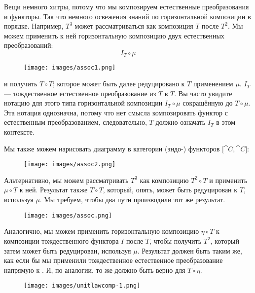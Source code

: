 Вещи немного хитры, потому что мы композируем естественные
преобразования и функторы. Так что немного освежения знаний по горизонтальной
композиции в порядке. Например, $T^3$ может рассматриваться как
композиция $T$ после $T^2$. Мы можем применить к ней
горизонтальную композицию двух естественных преобразований:
\[I_T \circ \mu\]

\begin{figure}[H]
  \centering
  \texttt{[image: images/assoc1.png]}
\end{figure}

\noindent
и получить $T \circ T$; которое может быть далее редуцировано к $T$
применением $\mu$. $I_T$ --- тождественное естественное преобразование
из $T$ в $T$. Вы часто увидите нотацию для этого
типа горизонтальной композиции $I_T \circ \mu$ сокращённую до
$T \circ \mu$. Эта нотация однозначна, потому что нет смысла
композировать функтор с естественным преобразованием, следовательно, $T$
должно означать $I_T$ в этом контексте.

\noindent
Мы также можем нарисовать диаграмму в категории (эндо-) функторов ${[}\cat{C}, \cat{C}{]}$:

\begin{figure}[H]
  \centering
  \texttt{[image: images/assoc2.png]}
\end{figure}

\noindent
Альтернативно, мы можем рассматривать $T^3$ как композицию
$T^2 \circ T$ и применить $\mu \circ T$ к ней. Результат также
$T \circ T$, который, опять, может быть редуцирован к $T$, используя $\mu$. Мы
требуем, чтобы два пути производили тот же результат.

\begin{figure}[H]
  \centering
  \texttt{[image: images/assoc.png]}
\end{figure}

\noindent
Аналогично, мы можем применить горизонтальную композицию $\eta \circ T$ к
композиции тождественного функтора $I$ после $T$, чтобы
получить $T^2$, который затем может быть редуцирован, используя $\mu$.
Результат должен быть таким же, как если бы мы применили тождественное естественное
преобразование напрямую к . И, по аналогии, то же должно
быть верно для $T \circ \eta$.

\begin{figure}[H]
  \centering
  \texttt{[image: images/unitlawcomp-1.png]}
\end{figure}

